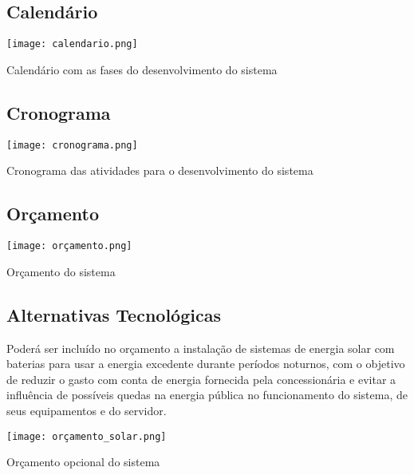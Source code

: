        \subsection{Calend\'{a}rio }
       \begin{table}[H]
	    \begin{center}
	    \texttt{[image: calendario.png]}
	    \caption{Calendário com as fases do desenvolvimento do sistema} \label{tab:calend}
	    \end{center}
       \end{table} 

       \subsection{Cronograma }
       \begin{table}[H]
	    \begin{center}
	    \texttt{[image: cronograma.png]}
	    \caption{Cronograma das atividades para o desenvolvimento do sistema} \label{tab:crono}
	    \end{center}
       \end{table} 

       \subsection{Or\c{c}amento }
             \begin{table}[H]
	    \begin{center}
	    \texttt{[image: orçamento.png]}
	    \caption{Orçamento do sistema} \label{tab:orca}
	    \end{center}
       \end{table} 

       \subsection{Alternativas Tecnol\'{o}gicas }
           Poderá ser incluído no orçamento a instalação de sistemas de energia solar com baterias para usar a energia excedente durante 		períodos noturnos, com o objetivo de reduzir o gasto com conta de energia fornecida pela concessionária e evitar a influência  de 	possíveis quedas na energia pública no funcionamento do sistema, de seus equipamentos e do servidor.	
	\begin{table}[H]
		    \begin{center}
		    \texttt{[image: orçamento\_solar.png]}
		    \caption{Orçamento opcional do sistema} \label{tab:orcaSol}
		    \end{center}
	\end{table} 
	


